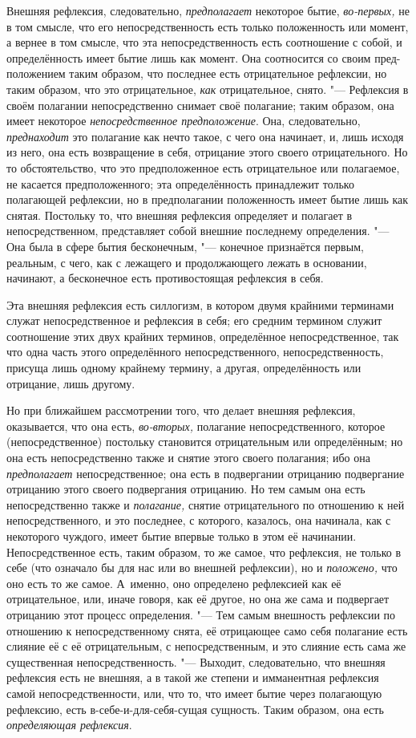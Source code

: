 Внешняя рефлексия, следовательно, {\em предполагает}
некоторое бытие, {\em во-первых,} не в том смысле, что
его непосредственность есть только положенность или момент, а вернее в том
смысле, что эта непосредственность есть соотношение с собой, и
определённость имеет бытие лишь как момент. Она соотносится со своим
пред-положением таким образом, что последнее есть отрицательное рефлексии,
но таким образом, что это отрицательное, {\em как}
отрицательное, снято. "--- Рефлексия в своём полагании непосредственно снимает
своё полагание; таким образом, она имеет некоторое
{\em непосредственное предположение}. Она,
следовательно, {\em преднаходит} это полагание как
нечто такое, с чего она начинает, и, лишь исходя из него, она есть
возвращение в себя, отрицание этого своего отрицательного. Но то
обстоятельство, что это предположенное есть отрицательное или полагаемое,
не касается предположенного; эта определённость принадлежит только
полагающей рефлексии, но в предполагании положенность имеет бытие лишь как
снятая. Постольку то, что внешняя рефлексия определяет и полагает в
непосредственном, представляет собой внешние последнему определения. "--- Она
была в сфере бытия бесконечным, "--- конечное признаётся первым, реальным, с
чего, как с лежащего и продолжающего лежать в основании, начинают, а
бесконечное есть противостоящая рефлексия в себя.

Эта внешняя рефлексия есть силлогизм, в котором двумя крайними терминами
служат непосредственное и рефлексия в себя; его средним термином служит
соотношение этих двух крайних терминов, определённое непосредственное, так
что одна часть этого определённого непосредственного, непосредственность,
присуща лишь одному крайнему термину, а другая, определённость или
отрицание, лишь другому.

Но при ближайшем рассмотрении того, что делает внешняя рефлексия,
оказывается, что она есть, {\em во-вторых,} полагание
непосредственного, которое (непосредственное) постольку становится
отрицательным или определённым; но она есть непосредственно также и снятие
этого своего полагания; ибо она {\em предполагает}
непосредственное; она есть в подвергании отрицанию подвергание отрицанию
этого своего подвергания отрицанию. Но тем самым она есть непосредственно
также и {\em полагание,} снятие отрицательного по
отношению к ней непосредственного, и это последнее, с которого, казалось,
она начинала, как с некоторого чуждого, имеет бытие впервые только в этом
её начинании. Непосредственное есть, таким образом, то же самое, что
рефлексия, не только в себе (что означало бы для нас или во внешней
рефлексии), но и {\em положено,} что оно есть то же
самое. А~именно, оно определено рефлексией как её отрицательное, или, иначе
говоря, как её другое, но она же сама и подвергает отрицанию этот процесс
определения. "--- Тем самым внешность рефлексии по отношению к
непосредственному снята, её отрицающее само себя полагание есть слияние её
с её отрицательным, с непосредственным, и это слияние есть сама же
существенная непосредственность. "--- Выходит, следовательно, что внешняя
рефлексия есть не внешняя, а в такой же степени и имманентная рефлексия
самой непосредственности, или, что то, что имеет бытие через полагающую
рефлексию, есть в-себе-и-для-себя-сущая сущность. Таким образом, она есть
{\em определяющая рефлексия}.

